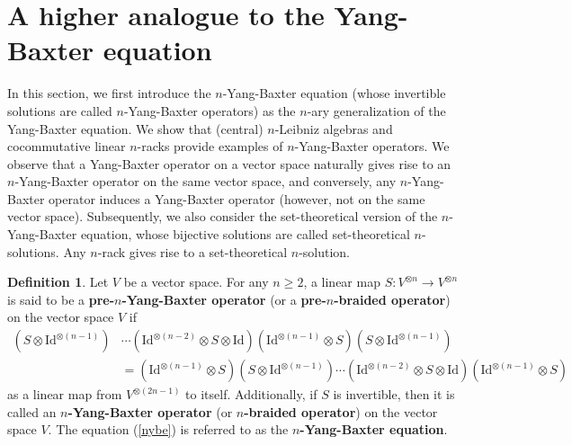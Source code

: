 \documentclass[a4paper,reqno,10pt]{amsart}
\theoremstyle{plain}
\theoremstyle{definition}
\newtheorem{defn}[thm]{Definition}
\theoremstyle{remark}
\begin{document}








\section{A higher analogue to the Yang-Baxter equation}\label{sec5}
In this section, we first introduce the $n$-Yang-Baxter equation (whose invertible solutions are called $n$-Yang-Baxter operators) as the $n$-ary generalization of the Yang-Baxter equation. We show that (central) $n$-Leibniz algebras and cocommutative linear $n$-racks provide examples of $n$-Yang-Baxter operators. We observe that a Yang-Baxter operator on a vector space naturally gives rise to an $n$-Yang-Baxter operator on the same vector space, and conversely, any $n$-Yang-Baxter operator induces a Yang-Baxter operator (however, not on the same vector space). Subsequently, we also consider the set-theoretical version of the $n$-Yang-Baxter equation, whose bijective solutions are called set-theoretical $n$-solutions. Any $n$-rack gives rise to a set-theoretical $n$-solution.

\begin{defn}
Let $V$ be a vector space. For any $n \geq 2$, a linear map $S : V^{\otimes n} \rightarrow V^{\otimes n}$ is said to be a {\bf pre-$n$-Yang-Baxter operator} (or a {\bf pre-$n$-braided operator}) on the vector space $V$ if
\begin{align}\label{nybe}
    (S \otimes \mathrm{Id}^{\otimes ( n-1)})& \cdots (\mathrm{Id}^{\otimes (n-2)} \otimes S \otimes \mathrm{Id})  (\mathrm{Id}^{\otimes (n-1)} \otimes S) (S \otimes \mathrm{Id}^{\otimes (n-1)}) \\
    &= (\mathrm{Id}^{\otimes (n-1)} \otimes S)  (S \otimes \mathrm{Id}^{\otimes (n-1)}) \cdots (\mathrm{Id}^{\otimes (n-2)} \otimes S \otimes \mathrm{Id})  (\mathrm{Id}^{\otimes (n-1)} \otimes S) \nonumber
\end{align}
as a linear map from $V^{\otimes (2n-1)}$ to itself. Additionally, if $S$ is invertible, then it is called an {\bf $n$-Yang-Baxter operator} (or {\bf $n$-braided operator}) on the vector space $V$. The equation (\ref{nybe}) is referred to as the {\bf $n$-Yang-Baxter equation}.
\end{defn}
\end{document}
